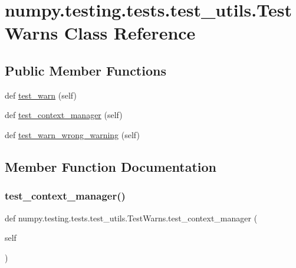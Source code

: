 \hypertarget{classnumpy_1_1testing_1_1tests_1_1test__utils_1_1TestWarns}{}\section{numpy.\+testing.\+tests.\+test\+\_\+utils.\+Test\+Warns Class Reference}
\label{classnumpy_1_1testing_1_1tests_1_1test__utils_1_1TestWarns}
\subsection*{Public Member Functions}
\begin{DoxyCompactItemize}
\item 
def \hyperlink{classnumpy_1_1testing_1_1tests_1_1test__utils_1_1TestWarns_a98e9d0416585ef8b97054300cee0ce88}{test\+\_\+warn} (self)
\item 
def \hyperlink{classnumpy_1_1testing_1_1tests_1_1test__utils_1_1TestWarns_ad9b48dcadeb21341b67424fd0a7fe695}{test\+\_\+context\+\_\+manager} (self)
\item 
def \hyperlink{classnumpy_1_1testing_1_1tests_1_1test__utils_1_1TestWarns_a22cdd560e89ffa49898c5060f725c2a7}{test\+\_\+warn\+\_\+wrong\+\_\+warning} (self)
\end{DoxyCompactItemize}


\subsection{Member Function Documentation}
\mbox{\label{classnumpy_1_1testing_1_1tests_1_1test__utils_1_1TestWarns_ad9b48dcadeb21341b67424fd0a7fe695}} 
\subsubsection{\texorpdfstring{test\+\_\+context\+\_\+manager()}{test\_context\_manager()}}
{\footnotesize\ttfamily def numpy.\+testing.\+tests.\+test\+\_\+utils.\+Test\+Warns.\+test\+\_\+context\+\_\+manager (\begin{DoxyParamCaption}\item[{}]{self }\end{DoxyParamCaption})}

